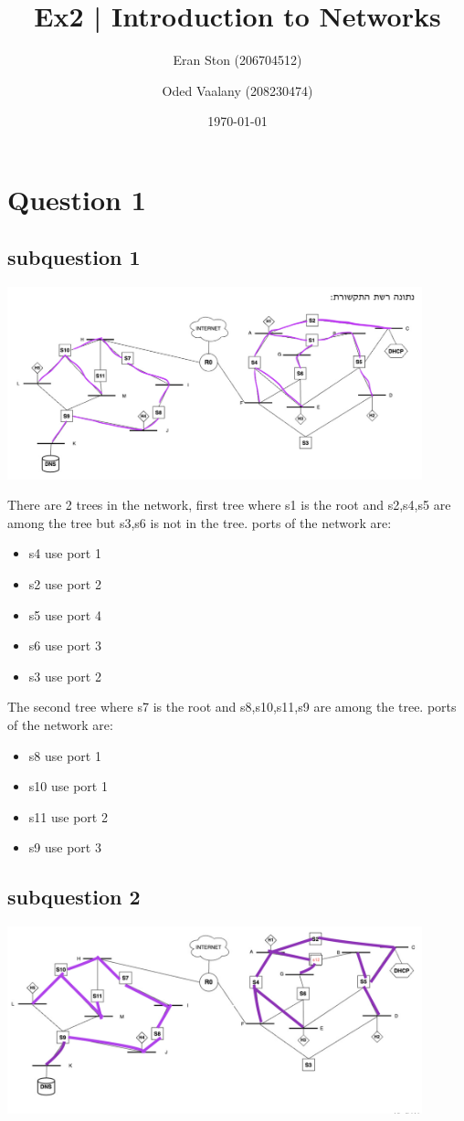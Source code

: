 \documentclass{article}
\title{Ex2 | Introduction to Networks}
\author{Eran Ston (206704512) \and Oded Vaalany (208230474)}
\date{\today}
\begin{document}
    \maketitle
    \section{Question 1}

    \subsection{subquestion 1}
    \includegraphics[width=0.9\textwidth]{stp.png}

    There are 2 trees in the network, 
    first tree where s1 is the root and s2,s4,s5 are among the tree but s3,s6 is not in the tree.
    ports of the network are:
    \begin{itemize}
        \item s4 use port 1 
        \item s2 use port 2 
        \item s5 use port 4 
        \item s6 use port 3 
        \item s3 use port 2 
    \end{itemize}

    The second tree where s7 is the root and s8,s10,s11,s9 are among the tree.
    ports of the network are:
    \begin{itemize}
        \item s8 use port 1
        \item s10 use port 1
        \item s11 use port 2
        \item s9 use port 3
    \end{itemize}

    \subsection{subquestion 2}
    \includegraphics[width=0.9\textwidth]{stp2.png}
\end{document}
